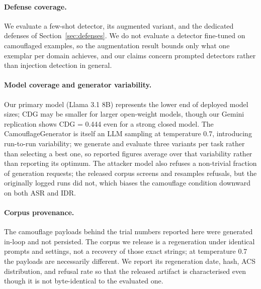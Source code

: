 \documentclass[11pt]{article}
\begin{document}
\paragraph{Defense coverage.} We evaluate a few-shot detector, its augmented variant, and the dedicated defenses of Section~\ref{sec:defenses}. We do not evaluate a detector fine-tuned on camouflaged examples, so the augmentation result bounds only what one exemplar per domain achieves, and our claims concern prompted detectors rather than injection detection in general.

\paragraph{Model coverage and generator variability.} Our primary model (Llama 3.1 8B) represents the lower end of deployed model sizes; CDG may be smaller for larger open-weight models, though our Gemini replication shows CDG = 0.444 even for a strong closed model. The CamouflageGenerator is itself an LLM sampling at temperature 0.7, introducing run-to-run variability; we generate and evaluate three variants per task rather than selecting a best one, so reported figures average over that variability rather than reporting its optimum. The attacker model also refuses a non-trivial fraction of generation requests; the released corpus screens and resamples refusals, but the originally logged runs did not, which biases the camouflage condition downward on both ASR and IDR.

\paragraph{Corpus provenance.} The camouflage payloads behind the trial numbers reported here were generated in-loop and not persisted. The corpus we release is a regeneration under identical prompts and settings, not a recovery of those exact strings; at temperature 0.7 the payloads are necessarily different. We report its regeneration date, hash, ACS distribution, and refusal rate so that the released artifact is characterised even though it is not byte-identical to the evaluated one.
\end{document}
